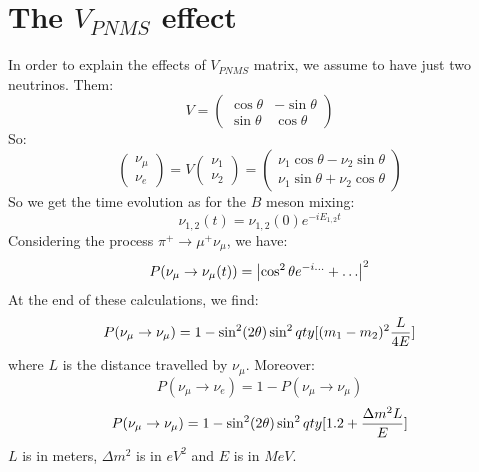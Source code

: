 \documentclass[../../main/main.tex]{subfiles}
\begin{document}
\section{The \( V_{PNMS} \) effect}
In order to explain the effects of \( V_{PNMS} \) matrix, we assume to have just two neutrinos. Them:
\begin{equation}
	V
	=
	\begin{pmatrix}
		\cos\theta & -\sin\theta \\
		\sin\theta &  \cos\theta
	\end{pmatrix}
	\label{eq:}
\end{equation}
So:
\begin{equation}
	\begin{pmatrix}
		\nu_{\mu}	\\
		\nu_{e}
	\end{pmatrix}
	=
	V
	\begin{pmatrix}
		\nu_1	\\
		\nu_2
	\end{pmatrix}
	=
	\begin{pmatrix}
		\nu_1 \cos\theta - \nu_2 \sin\theta \\
		\nu_1 \sin\theta + \nu_2 \cos\theta
	\end{pmatrix}
	\label{eq:}
\end{equation}
So we get the time evolution as for the \( B \) meson mixing:
\begin{equation}
	\nu_{1,2}(t)
	=
	\nu_{1,2}(0) e^{-i E_{1,2} t}
	\label{eq:}
\end{equation}
Considering the process \( \pi^+ \rightarrow \mu^+ \nu_{\mu} \), we have:
\begin{equation}
	P(\nu_{\mu} \rightarrow \nu_{\mu}(t))
	=
	\abs{\cos^2\theta e^{-i \dots} + \dots}^2 %
	\label{eq:}
\end{equation}
At the end of these calculations, we find:
\begin{equation}
	P(\nu_{\mu} \rightarrow \nu_{\mu})
	=
	1 - \sin^2(2\theta) \sin^2 \\qty[(m_1 - m_2)^2 \frac{L}{4E}]
	\label{eq:}
\end{equation}
where \( L \) is the distance travelled by \( \nu_{\mu} \). Moreover:
\begin{equation}
	P(\nu_{\mu} \rightarrow \nu_{e})
	=
	1 - P(\nu_{\mu} \rightarrow \nu_{\mu})
	\label{eq:}
\end{equation}
\begin{equation}
	P(\nu_{\mu} \rightarrow \nu_{\mu})
	=
	1 - \sin^2(2\theta) \sin^2 \\qty[1.2 + \frac{\Delta m^2 L}{E}]
	\label{eq:}
\end{equation}
\( L \) is in meters, \( \Delta m^2 \) is in \( \si{eV^2} \) and \( E \) is in \( \si{MeV} \).
\end{document}
